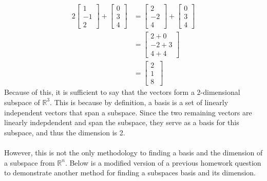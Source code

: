 \documentclass{report}
\begin{document}
$$
\begin{aligned}
	2 \begin{bmatrix} 1 \\ -1 \\ 2 \end{bmatrix} +
	\begin{bmatrix} 0 \\ 3 \\ 4 \end{bmatrix}  & =
	\begin{bmatrix} 2 \\ -2 \\ 4 \end{bmatrix} +
	\begin{bmatrix} 0 \\ 3 \\ 4 \end{bmatrix} \\
	& = \begin{bmatrix} 2 + 0 \\ -2 + 3 \\ 4 + 4 \end{bmatrix} \\
	& = \begin{bmatrix} 2 \\ 1 \\ 8 \ \end{bmatrix}
\end{aligned}
$$
Because of this, it is sufficient to say that the vectors form a 2-dimensional subspace of $\mathbb{R}^3$. This is because by definition, a basis is a set of linearly independent vectors that span a subspace. Since the two remaining vectors are linearly indepdendent and span the subspace, they serve as a basis for this subspace, and thus the dimension is 2. \\
\\
\noindent However,  this is not the only methodology to finding a basis and the dimension of a subspace from $\mathbb{R}^n$.  Below is a modified version of a previous homework question to demonstrate another method for finding a subspaces basis and its dimension.
\end{document}
